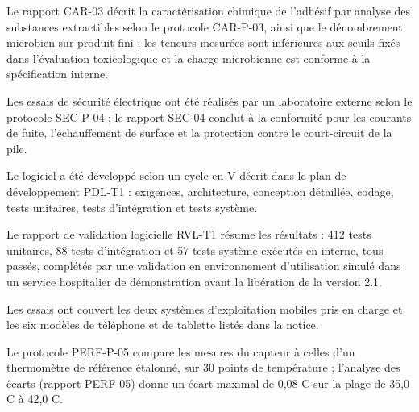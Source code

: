 \documentclass[11pt,a4paper]{article}
\begin{document}
{\small Le rapport CAR-03 décrit la caractérisation chimique de l'adhésif par analyse des substances extractibles selon le protocole CAR-P-03, ainsi que le dénombrement microbien sur produit fini ; les teneurs mesurées sont inférieures aux seuils fixés dans l'évaluation toxicologique et la charge microbienne est conforme à la spécification interne.}\par

\par{}\par

{\small Les essais de sécurité électrique ont été réalisés par un laboratoire externe selon le protocole SEC-P-04 ; le rapport SEC-04 conclut à la conformité pour les courants de fuite, l'échauffement de surface et la protection contre le court-circuit de la pile.}\par

\par{}\par

{\small Le logiciel a été développé selon un cycle en V décrit dans le plan de développement PDL-T1 : exigences, architecture, conception détaillée, codage, tests unitaires, tests d'intégration et tests système.}\par

{\small Le rapport de validation logicielle RVL-T1 résume les résultats : 412 tests unitaires, 88 tests d'intégration et 57 tests système exécutés en interne, tous passés, complétés par une validation en environnement d'utilisation simulé dans un service hospitalier de démonstration avant la libération de la version 2.1.}\par

{\small Les essais ont couvert les deux systèmes d'exploitation mobiles pris en charge et les six modèles de téléphone et de tablette listés dans la notice.}\par

\par{}\par

{\small Le protocole PERF-P-05 compare les mesures du capteur à celles d'un thermomètre de référence étalonné, sur 30 points de température ; l'analyse des écarts (rapport PERF-05) donne un écart maximal de 0,08 \textdegree{}C sur la plage de 35,0 \textdegree{}C à 42,0 \textdegree{}C.}\par
\end{document}
